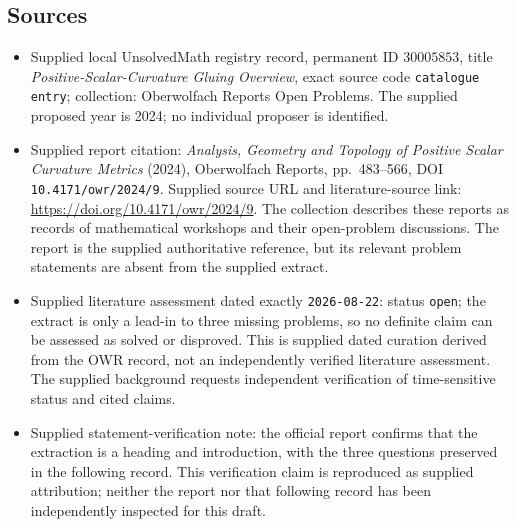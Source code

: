 \documentclass[11pt]{article}
\begin{document}
\subsection{Sources}
\begin{itemize}
\item Supplied local UnsolvedMath registry record, permanent ID \(30005853\), title \emph{Positive-Scalar-Curvature Gluing Overview}, exact source code \texttt{catalogue entry}; collection: Oberwolfach Reports Open Problems. The supplied proposed year is 2024; no individual proposer is identified.
\item Supplied report citation: \emph{Analysis, Geometry and Topology of Positive Scalar Curvature Metrics} (2024), Oberwolfach Reports, pp.\ 483--566, DOI \texttt{10.4171/owr/2024/9}. Supplied source URL and literature-source link: \url{https://doi.org/10.4171/owr/2024/9}. The collection describes these reports as records of mathematical workshops and their open-problem discussions. The report is the supplied authoritative reference, but its relevant problem statements are absent from the supplied extract.
\item Supplied literature assessment dated exactly \texttt{2026-08-22}: status \texttt{open}; the extract is only a lead-in to three missing problems, so no definite claim can be assessed as solved or disproved. This is supplied dated curation derived from the OWR record, not an independently verified literature assessment. The supplied background requests independent verification of time-sensitive status and cited claims.
\item Supplied statement-verification note: the official report confirms that the extraction is a heading and introduction, with the three questions preserved in the following record. This verification claim is reproduced as supplied attribution; neither the report nor that following record has been independently inspected for this draft.
\end{itemize}
\end{document}
